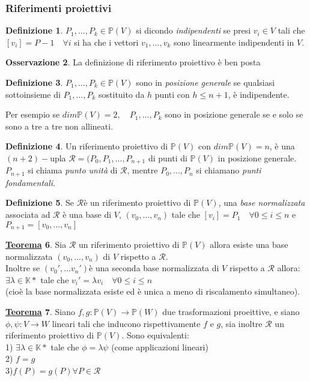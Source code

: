 \documentclass[a4paper,twoside]{article}
\newcommand{\Pro}{\mathbb{P}}
\newcommand{\K}{\mathbb{K}}
\theoremstyle{definition}
\newtheorem{theorem}{\color{Red}\underline{\textrm Teorema}}
\newtheorem{definizione}[theorem]{Definizione}
\newtheorem{oss}[theorem]{Osservazione}
\numberwithin{theorem}{section}
\begin{document}
\subsubsection{Riferimenti proiettivi}
\begin{definizione}
    $P_1,...,P_k\in\Pro(V)$ si dicondo \emph{indipendenti} se presi $v_i\in V$ tali che $[v_i]=P-1 \quad \forall i$ si ha che i vettori $v_1,...,v_k$ sono linearmente indipendenti in $V$.
\end{definizione}
\begin{oss}
    La definizione di riferimento proiettivo è ben posta
\end{oss}
\begin{definizione}
    $P_1,...,P_k\in\Pro(V)$ sono in \emph{posizione generale} se qualsiasi sottoinsieme di ${P_1,...,P_k}$ sostituito da $h$ punti con $h\leq n+1$, è indipendente. \par
    Per esempio se $dim\Pro(V)=2,\quad P_1,...,P_k$ sono in posizione generale se e solo se sono a tre a tre non allineati.
\end{definizione}
\begin{definizione}
    Un riferimento proiettivo di $\Pro(V)$ con $dim\Pro(V)=n$, è una $(n+2)-$upla $\mathcal{R}=(P_0,P_1,...,P_{n+1}$ di punti di $\Pro(V)$ in posizione generale. $P_{n+1}$ si chiama \emph{punto unità} di $\mathcal{R}$, mentre $P_0,...,P_n$ si chiamano \emph{punti fondamentali}.
\end{definizione}
\begin{definizione}
    Se $\mathcal{R}$è un riferimento proiettivo di $\Pro(V)$, una \emph{base normalizzata} associata ad $\mathcal{R}$ è una base di $V$, $(v_0,...,v_n)$ tale che $[v_i]=P_1\quad\forall 0\leq i\leq n$ e $P_{n+1}=[v_0,...,v_n]$ 
\end{definizione}
\begin{theorem}
    Sia $\mathcal{R}$ un riferimento proiettivo di $\Pro(V)$ allora esiste una base normalizzata $(v_0,...,v_n)$ di $V$ rispetto a $\mathcal{R}$. \\
    Inoltre se $(v_0',...v_n')$è una seconda base normalizzata di $V$ rispetto a $\mathcal{R}$ allora: $\exists\lambda\in\K*$ tale che $v_i'=\lambda v_i\quad\forall0\leq i\leq n$ \\
    (cioè la base normalizzata esiste ed è unica a meno di riscalamento simultaneo).
\end{theorem}
\begin{theorem}
    Siano $f,g:\Pro(V)\to\Pro(W)$ due trasformazioni proeittive, e siano $\phi,\psi:V\to W$ lineari tali che inducono rispettivamente $f$ e $g$, sia inoltre $\mathcal{R}$ un riferimento proiettivo di $\Pro(V)$. Sono equivalenti: \\
    1) $\exists\lambda\in\K*$ tale che $\phi=\lambda\psi$ (come applicazioni lineari)\\
    2) $f=g$\\
    3)$f(P)=g(P) \forall P\in\mathcal{R}$
\end{theorem}
\end{document}
